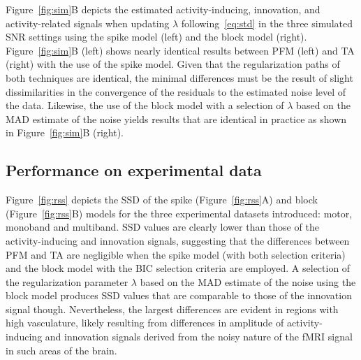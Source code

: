  Figure~\ref{fig:sim}B depicts the estimated activity-inducing, innovation, and activity-related signals when updating $\lambda$ following~\eqref{eq:std} in the three simulated SNR settings using the spike model (left) and the block model (right). Figure~\ref{fig:sim}B (left) shows nearly identical results between PFM (left) and TA (right) with the use of the spike model. Given that the regularization paths of both techniques are identical, the minimal differences must be the result of slight dissimilarities in the convergence of the residuals to the estimated noise level of the data. Likewise, the use of the block model with a selection of $\lambda$ based on the MAD estimate of the noise yields results that are identical in practice as shown in Figure~\ref{fig:sim}B (right).

\subsection{Performance on experimental data}

Figure~\ref{fig:rss} depicts the SSD of the spike (Figure~\ref{fig:rss}A) and block (Figure~\ref{fig:rss}B) models for the three experimental datasets introduced: motor, monoband and multiband. SSD values are clearly lower than those of the activity-inducing and innovation signals, suggesting that the differences between PFM and TA are negligible when the spike model (with both selection criteria) and the block model with the BIC selection criteria are employed. A selection of the regularization parameter $\lambda$ based on the MAD estimate of the noise using the block model produces SSD values that are comparable to those of the innovation signal though. Nevertheless, the largest differences are evident in regions with high vasculature, likely resulting from differences in amplitude of activity-inducing and innovation signals derived from the noisy nature of the fMRI signal in such areas of the brain. 


